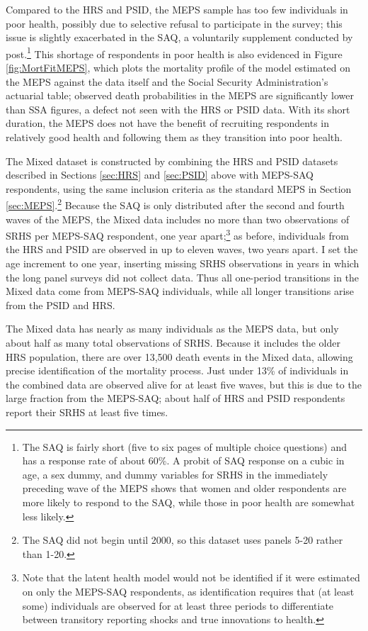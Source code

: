 \documentclass[12pt,pdftex,letterpaper]{article}
\begin{document}
Compared to the HRS and PSID, the MEPS sample has too few individuals in poor health, possibly due to selective refusal to participate in the survey; this issue is slightly exacerbated in the SAQ, a voluntarily supplement conducted by post.\footnote{The SAQ is fairly short (five to six pages of multiple choice questions) and has a response rate of about 60\%.  A probit of SAQ response on a cubic in age, a sex dummy, and dummy variables for SRHS in the immediately preceding wave of the MEPS shows that women and older respondents are more likely to respond to the SAQ, while those in poor health are somewhat less likely.}  This shortage of respondents in poor health is also evidenced in Figure \ref{fig:MortFitMEPS}, which plots the mortality profile of the model estimated on the MEPS against the data itself and the Social Security Administration's actuarial table; observed death probabilities in the MEPS are significantly lower than SSA figures, a defect not seen with the HRS or PSID data.  With its short duration, the MEPS does not have the benefit of recruiting respondents in relatively good health and following them as they transition into poor health.

The Mixed dataset is constructed by combining the HRS and PSID datasets described in Sections \ref{sec:HRS} and \ref{sec:PSID} above with MEPS-SAQ respondents, using the same inclusion criteria as the standard MEPS in Section \ref{sec:MEPS}.\footnote{The SAQ did not begin until 2000, so this dataset uses panels 5-20 rather than 1-20.}  Because the SAQ is only distributed after the second and fourth waves of the MEPS, the Mixed data includes no more than two observations of SRHS per MEPS-SAQ respondent, one year apart;\footnote{Note that the latent health model would not be identified if it were estimated on only the MEPS-SAQ respondents, as identification requires that (at least some) individuals are observed for at least three periods to differentiate between transitory reporting shocks and true innovations to health.} as before, individuals from the HRS and PSID are observed in up to eleven waves, two years apart.  I set the age increment to one year, inserting missing SRHS observations in years in which the long panel surveys did not collect data.  Thus all one-period transitions in the Mixed data come from MEPS-SAQ individuals, while all longer transitions arise from the PSID and HRS.

The Mixed data has nearly as many individuals as the MEPS data, but only about half as many total observations of SRHS.  Because it includes the older HRS population, there are over 13,500 death events in the Mixed data, allowing precise identification of the mortality process.  Just under 13\% of individuals in the combined data are observed alive for at least five waves, but this is due to the large fraction from the MEPS-SAQ; about half of HRS and PSID respondents report their SRHS at least five times.
\end{document}
